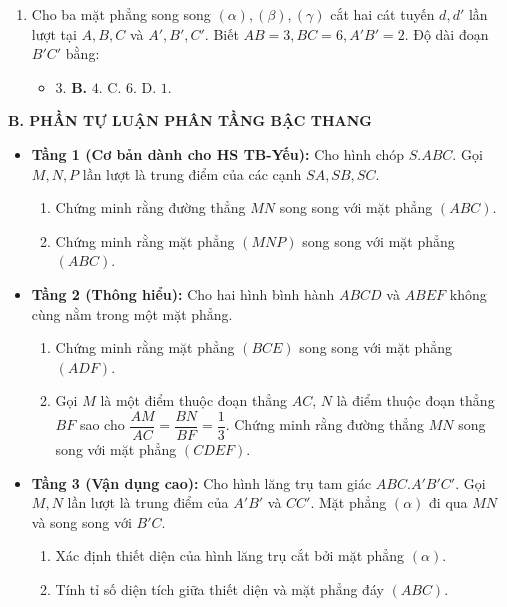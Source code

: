 \documentclass[12pt, a4paper]{article}
\begin{document}
\begin{enumerate}[leftmargin=0.6cm]
    \item Cho ba mặt phẳng song song $(\alpha), (\beta), (\gamma)$ cắt hai cát tuyến $d, d'$ lần lượt tại $A, B, C$ và $A', B', C'$. Biết $AB = 3, BC = 6, A'B' = 2$. Độ dài đoạn $B'C'$ bằng:
    \begin{itemize}[leftmargin=0.6cm]
        \item[A.] $3$. \quad \textbf{B.} $4$. \quad C. $6$. \quad D. $1$.
    \end{itemize}
\end{enumerate}

\noindent \textbf{B. PHẦN TỰ LUẬN PHÂN TẦNG BẬC THANG}
\begin{itemize}[leftmargin=0.6cm]
    \item \textbf{Tầng 1 (Cơ bản dành cho HS TB-Yếu):}
    Cho hình chóp $S.ABC$. Gọi $M, N, P$ lần lượt là trung điểm của các cạnh $SA, SB, SC$.
    \begin{enumerate}[leftmargin=0.5cm]
        \item Chứng minh rằng đường thẳng $MN$ song song với mặt phẳng $(ABC)$.
        \item Chứng minh rằng mặt phẳng $(MNP)$ song song với mặt phẳng $(ABC)$.
    \end{enumerate}

    \item \textbf{Tầng 2 (Thông hiểu):}
    Cho hai hình bình hành $ABCD$ và $ABEF$ không cùng nằm trong một mặt phẳng.
    \begin{enumerate}[leftmargin=0.5cm]
        \item Chứng minh rằng mặt phẳng $(BCE)$ song song với mặt phẳng $(ADF)$.
        \item Gọi $M$ là một điểm thuộc đoạn thẳng $AC$, $N$ là điểm thuộc đoạn thẳng $BF$ sao cho $\dfrac{AM}{AC} = \dfrac{BN}{BF} = \dfrac{1}{3}$. Chứng minh rằng đường thẳng $MN$ song song với mặt phẳng $(CDEF)$.
    \end{enumerate}

    \item \textbf{Tầng 3 (Vận dụng cao):}
    Cho hình lăng trụ tam giác $ABC.A'B'C'$. Gọi $M, N$ lần lượt là trung điểm của $A'B'$ và $CC'$. Mặt phẳng $(\alpha)$ đi qua $MN$ và song song với $B'C$.
    \begin{enumerate}[leftmargin=0.5cm]
        \item Xác định thiết diện của hình lăng trụ cắt bởi mặt phẳng $(\alpha)$.
        \item Tính tỉ số diện tích giữa thiết diện và mặt phẳng đáy $(ABC)$.
    \end{enumerate}
\end{itemize}
\end{document}
